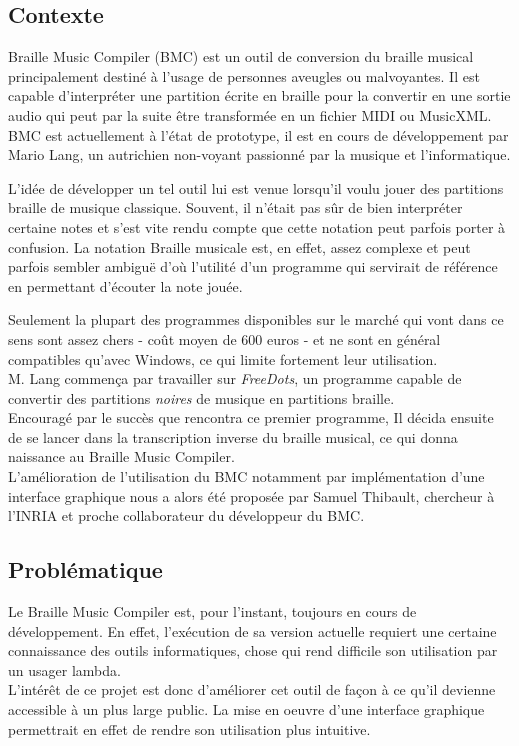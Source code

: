 \subsection*{Contexte}
Braille Music Compiler (BMC) est un outil de conversion du braille musical principalement destiné à l'usage de personnes aveugles ou malvoyantes. Il est capable d'interpréter une partition écrite en braille pour la convertir en une sortie audio qui peut par la suite être transformée en un fichier  MIDI ou MusicXML.\\

  BMC est actuellement à l'état de prototype, il est en cours de développement par Mario Lang, un autrichien non-voyant passionné par la musique et l'informatique.

  L'idée de développer un tel outil lui est venue lorsqu'il voulu jouer des partitions braille de musique classique. Souvent, il n'était pas sûr de bien interpréter certaine notes et s'est vite rendu compte que cette notation peut parfois porter à confusion. La notation Braille musicale est, en effet, assez complexe et peut parfois sembler ambiguë d'où l'utilité d'un programme qui servirait de référence en permettant d'écouter la note jouée. 
  
  Seulement la plupart des programmes disponibles sur le marché qui vont dans ce sens sont assez chers - coût moyen de 600 euros - et ne sont en général compatibles qu'avec Windows, ce qui limite fortement leur utilisation.\\
 
  M. Lang commença par travailler sur \textit{FreeDots}, un programme capable de convertir des partitions \textit{noires} de musique en partitions braille.\\
  Encouragé par le succès que rencontra ce premier programme, Il décida ensuite de se lancer dans la transcription inverse du braille musical, ce qui donna naissance au Braille Music Compiler. \\
  
  L'amélioration de l'utilisation du BMC notamment par implémentation d'une interface graphique nous a alors été proposée par Samuel Thibault, chercheur à l'INRIA et proche collaborateur du développeur du BMC. 
  
  
 
\subsection*{Problématique}
Le Braille Music Compiler est, pour l'instant, toujours en cours de développement. En effet, l'exécution de sa version actuelle requiert une certaine connaissance des outils informatiques, chose qui rend difficile son utilisation par un usager lambda.\\
L'intérêt de ce projet est donc d'améliorer cet outil de façon à ce qu'il devienne accessible à un plus large public. La mise en oeuvre d'une interface graphique permettrait en effet de rendre son utilisation plus intuitive.\\

